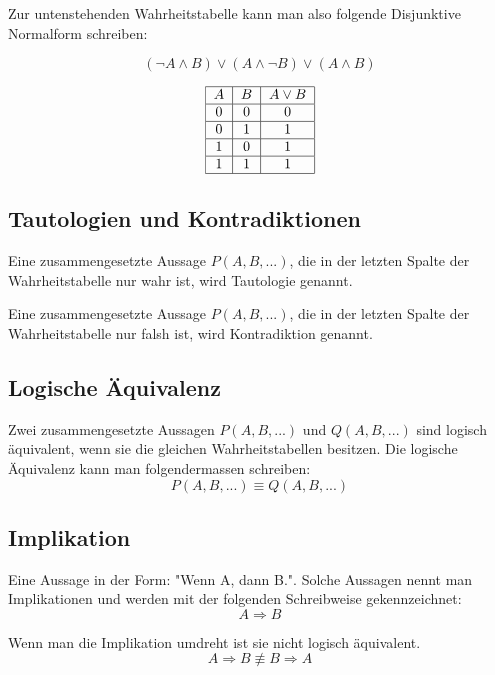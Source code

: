 \documentclass[12pt, a4paper, oneside]{article}
\begin{document}
Zur untenstehenden Wahrheitstabelle kann man also folgende Disjunktive Normalform schreiben:

\begin{equation}
  (\lnot A \land B) \lor (A \land \lnot B) \lor (A \land B)
\end{equation}

\begin{equation}
  \begin{tabular}{|c|c|c|}
  \hline
  $A$ & $B$ & $A \lor B$ \\ \hline
  0 & 0 & 0 \\ \hline
  0 & 1 & 1 \\ \hline
  1 & 0 & 1 \\ \hline
  1 & 1 & 1 \\ \hline
  \end{tabular}
\end{equation} 

\subsection{Tautologien und Kontradiktionen}
Eine zusammengesetzte Aussage $P(A, B,...)$, die in der letzten Spalte der Wahrheitstabelle nur wahr ist, wird Tautologie genannt.

Eine zusammengesetzte Aussage $P(A, B,...)$, die in der letzten Spalte der Wahrheitstabelle nur falsh ist, wird Kontradiktion genannt.

\subsection{Logische Äquivalenz}
Zwei zusammengesetzte Aussagen $P(A, B,...)$ und $Q(A, B,...)$ sind logisch äquivalent, wenn sie die gleichen Wahrheitstabellen besitzen. Die logische Äquivalenz kann man folgendermassen schreiben:
\begin{equation} 
  P(A, B,...) \equiv Q(A, B,...)
\end{equation}

\subsection{Implikation}
Eine Aussage in der Form: "Wenn A, dann B.". Solche Aussagen nennt man Implikationen und werden mit der folgenden Schreibweise gekennzeichnet:
\begin{equation}
  A \Rightarrow B 
\end{equation}

Wenn man die Implikation umdreht ist sie nicht logisch äquivalent.
\begin{equation}
  A \Rightarrow B \not\equiv B \Rightarrow A
\end{equation}
\end{document}

